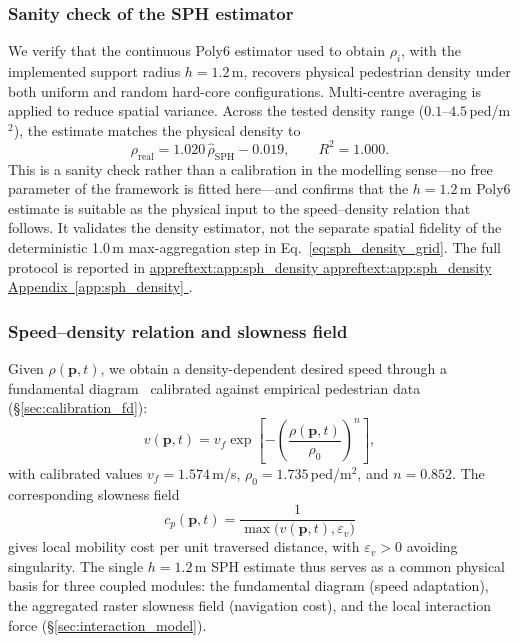 \documentclass[preprint,12pt]{elsarticle}
\providecommand{\FloatBarrier}{}
\let\origsubsubsection\subsubsection
\renewcommand{\subsubsection}{\FloatBarrier\origsubsubsection}
\DeclareRobustCommand{\appref}[1]{%
  \hyperref[#1]{%
    \ifcsname appreftext:#1\endcsname%
      \csname appreftext:#1\endcsname%
    \else%
      Appendix~\ref*{#1}%
    \fi%
  }%
}
\begin{document}
\subsubsection{Sanity check of the SPH estimator}
\label{sec:density_check}

We verify that the continuous Poly6 estimator used to obtain $\rho_i$,
with the implemented support radius $h=1.2$\,m, recovers physical
pedestrian density under both uniform and random hard-core
configurations. Multi-centre averaging is applied to reduce spatial
variance. Across the tested density range ($0.1$--$4.5$\,ped/m$^2$),
the estimate matches the physical density to
\begin{equation}
\rho_{\mathrm{real}}
= 1.020\, \hat{\rho}_{\mathrm{SPH}} - 0.019,
\qquad R^2 = 1.000.
\end{equation}
This is a sanity check rather than a calibration in the modelling
sense---no free parameter of the framework is fitted here---and confirms
that the $h=1.2$\,m Poly6 estimate is suitable as the physical input to
the speed--density relation that follows. It validates the density
estimator, not the separate spatial fidelity of the deterministic
1.0\,m max-aggregation step in Eq.~\eqref{eq:sph_density_grid}. The full
protocol is reported in \appref{app:sph_density}.

\subsubsection{Speed--density relation and slowness field}
\label{sec:speed_density_cost}

Given $\rho(\mathbf{p}, t)$, we obtain a density-dependent desired speed
through a fundamental
diagram~\citep{weidmann1993fundamental,Helbing1995SocialForce} calibrated against
empirical pedestrian data (\S\ref{sec:calibration_fd}):
\begin{equation}
v(\mathbf{p}, t) = v_f \exp\!\left[ -\!\left( \frac{\rho(\mathbf{p}, t)}{\rho_0} \right)^{n} \right],
\label{eq:speed_field}
\end{equation}
with calibrated values $v_f = 1.574$\,m/s, $\rho_0 = 1.735$\,ped/m$^2$,
and $n = 0.852$. The corresponding slowness field
\begin{equation}
c_p(\mathbf{p}, t) = \frac{1}{\max\!\big(v(\mathbf{p}, t), \varepsilon_v\big)}
\label{eq:slowness_field}
\end{equation}
gives local mobility cost per unit traversed distance, with
$\varepsilon_v > 0$ avoiding singularity. The single $h=1.2$\,m SPH
estimate thus serves as a common physical basis for three coupled
modules: the fundamental diagram (speed adaptation), the aggregated
raster slowness field (navigation cost), and the local interaction force
(\S\ref{sec:interaction_model}).
\end{document}
